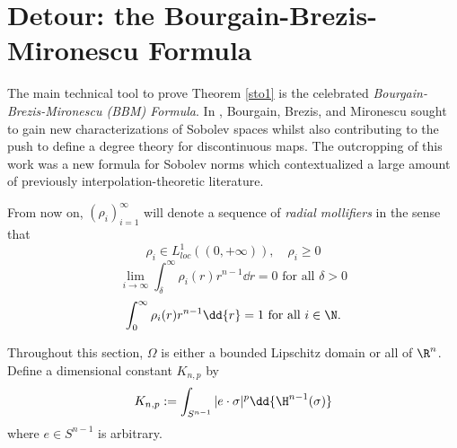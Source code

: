 \documentclass[../main.tex]{subfiles}
\begin{document}
\section{Detour: the Bourgain-Brezis-Mironescu Formula}\label{sec:bbm}

The main technical tool to prove Theorem \ref{sto1} is the celebrated \textit{Bourgain-Brezis-Mironescu (BBM) Formula}. In \cite{brezis:2001, brezis:2002}, Bourgain, Brezis, and Mironescu sought to gain new characterizations of Sobolev spaces whilst also contributing to the push to define a degree theory for discontinuous maps. The outcropping of this work was a new formula for Sobolev norms which contextualized a large amount of previously interpolation-theoretic literature.


\begin{definition}
From now on, $ (\rho_{i})_{i=1}^{\infty} $ will denote a sequence of \textit{radial mollifiers} in the sense that 
\begin{equation}
    \rho_{i}\in L^{1}_{loc}((0,+\infty)),\quad \rho_{i}\geq 0
\end{equation}
\begin{equation}
    \lim_{i\to\infty}\int_{\delta}^{\infty} \rho_{i}(r)r^{n-1}\dd{r} = 0 \text{ for all } \delta>0 
\end{equation}
\begin{equation}
    \int_{0}^{\infty}\rho_{i}(r)r^{n-1}\dd{r} = 1 \text{ for all } i\in \N.
\end{equation}


\end{definition}
Throughout this section, $ \Omega $ is either a bounded Lipschitz domain or all of $ \R^{n} $.
Define a dimensional constant $ K_{n,p} $ by 
\[
    K_{n,p}:= \int_{S^{n-1}} |e\cdot \sigma|^p \dd{\H^{n-1}(\sigma)}
\]
where $ e\in S^{n-1} $ is arbitrary.\\
\end{document}
